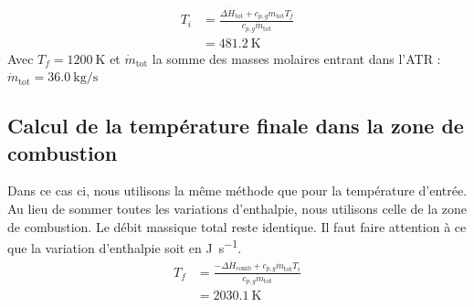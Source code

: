 \documentclass[french, a4paper, 10pt]{article}
\begin{document}
\begin{align}
T_i &= \frac{\Delta\dot{H}_\text{tot}+c_{p,g}\dot{m}_\text{tot}T_f}{c_{p,g}\dot{m}_\text{tot}}\\
&= \SI{481.2}{\kelvin}
\end{align}
Avec $T_f = \SI{1200}{\kelvin}$ et $\dot{m}_\text{tot}$ la somme des masses molaires entrant dans l'ATR : $\dot{m}_\text{tot} = \SI{36.0}{\kilo\gram\per\second}$

\subsection{Calcul de la température finale dans la zone de combustion}
Dans ce cas ci, nous utilisons la même méthode que pour la température d'entrée. Au lieu de sommer toutes les variations d'enthalpie, nous utilisons celle de la zone de combustion. Le débit massique total reste identique. Il faut faire attention à ce que la variation d'enthalpie soit en \si{\joule\per\second}.
\begin{align}
T_f &= \frac{-\Delta\dot{H}_\text{comb}+c_{p,g}\dot{m}_\text{tot}T_i}{c_{p,g}\dot{m}_\text{tot}}\\
&= \SI{2030.1}{\kelvin}
\end{align}
\end{document}
